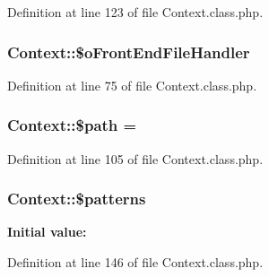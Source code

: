 Definition at line 123 of file Context.\+class.\+php.

\hypertarget{classContext_a55e855769152e53af5e2ecb9b889c7f6}{}
\subsubsection[{\$o\+Front\+End\+File\+Handler}]{\setlength{\rightskip}{0pt plus 5cm}Context\+::\$o\+Front\+End\+File\+Handler}\label{classContext_a55e855769152e53af5e2ecb9b889c7f6}


Definition at line 75 of file Context.\+class.\+php.

\hypertarget{classContext_a0752e74e1ec01a4fd63c044a1d3bd28b}{}
\subsubsection[{\$path}]{\setlength{\rightskip}{0pt plus 5cm}Context\+::\$path = \textquotesingle{}\textquotesingle{}}\label{classContext_a0752e74e1ec01a4fd63c044a1d3bd28b}


Definition at line 105 of file Context.\+class.\+php.

\hypertarget{classContext_a257fa15929338411949a173ff34ab35d}{}
\subsubsection[{\$patterns}]{\setlength{\rightskip}{0pt plus 5cm}Context\+::\$patterns}\label{classContext_a257fa15929338411949a173ff34ab35d}
{\bfseries Initial value\+:}


Definition at line 146 of file Context.\+class.\+php.

\hypertarget{classContext_a1e80f487f65708456eb17be0024aee50}{}

